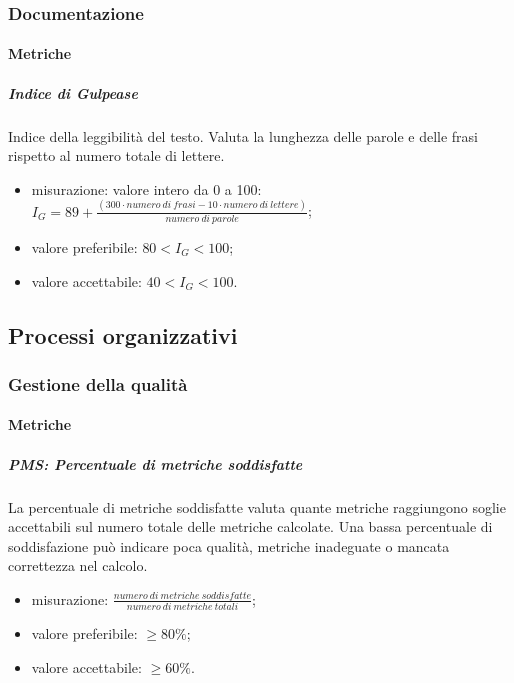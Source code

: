 	\subsubsection{Documentazione}
		\paragraph{Metriche}
			\subparagraph{Indice di Gulpease}
			Indice della leggibilità del testo. Valuta la lunghezza delle parole e delle frasi rispetto al numero totale di lettere. 
			\begin{itemize}
				\item misurazione: valore intero da 0 a 100:\newline 	
				$I_G = 89+ \frac{(300 \cdot numero\ di\ frasi - 10 \cdot numero\ di\ lettere)}{numero\ di\ parole}$;	
				\item valore preferibile: $80 < I_G < 100$;
				\item valore accettabile: $40 < I_G < 100$.
			\end{itemize}
			
\subsection{Processi organizzativi}
	\subsubsection{Gestione della qualità}
		\paragraph{Metriche}
			\subparagraph{PMS: Percentuale di metriche soddisfatte}
			La percentuale di metriche soddisfatte valuta quante metriche raggiungono soglie accettabili sul numero totale delle metriche calcolate. Una bassa percentuale di soddisfazione può indicare poca qualità, metriche inadeguate o mancata correttezza nel calcolo.
			\begin{itemize}
				\item misurazione: $\frac{numero\ di\ metriche\ soddisfatte}{numero\ di\ metriche\ totali} $;
				\item valore preferibile: $ \geq 80\%$;
				\item valore accettabile: $ \geq 60\%$.
			\end{itemize}
		